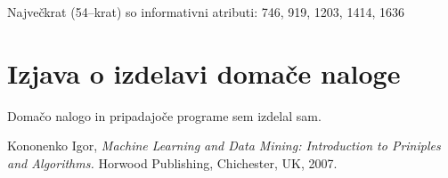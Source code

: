 \documentclass[a4paper,11pt]{article}
\begin{document}
Največkrat (54--krat) so informativni atributi: 746, 919, 1203, 1414, 1636

\section{Izjava o izdelavi domače naloge}
Domačo nalogo in pripadajoče programe sem izdelal sam.


\begin{thebibliography}{9}

   Kononenko Igor,
   \emph{Machine Learning and Data Mining:
   Introduction to Priniples and Algorithms.}
   Horwood Publishing, Chichester, UK,   
   2007.

\end{thebibliography}
\end{document}
